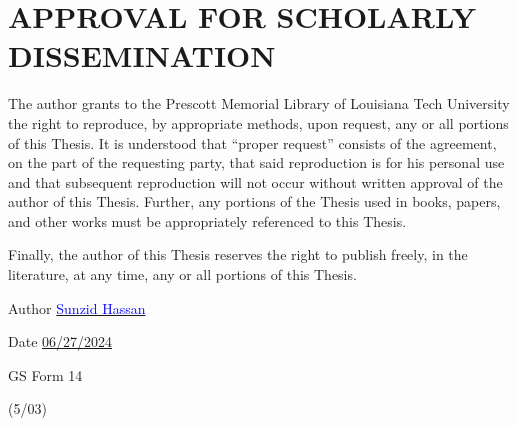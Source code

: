 \chapter*{APPROVAL FOR SCHOLARLY DISSEMINATION}

The author grants to the Prescott Memorial Library of Louisiana Tech University the right to reproduce, 
by appropriate methods, upon request, any or all portions of this Thesis.  It is understood that “proper request” consists of the agreement, on the part of the requesting party, that said reproduction is for his personal use and that subsequent reproduction will not occur without written approval of the author of this Thesis.  Further, any portions of the Thesis used in books, papers, and other works must be appropriately referenced to this Thesis. 

Finally, the author of this Thesis reserves the right to publish freely, in the literature, at any time, any or all portions of this Thesis. 

\begin{center}
    Author \underline{\textcolor{blue}{Sunzid Hassan}}
    
    Date \underline{06/27/2024}
\end{center}

\vfill

\begin{flushright}
\begin{singlespace}
GS Form 14 

(5/03)
\end{singlespace}
\end{flushright}

